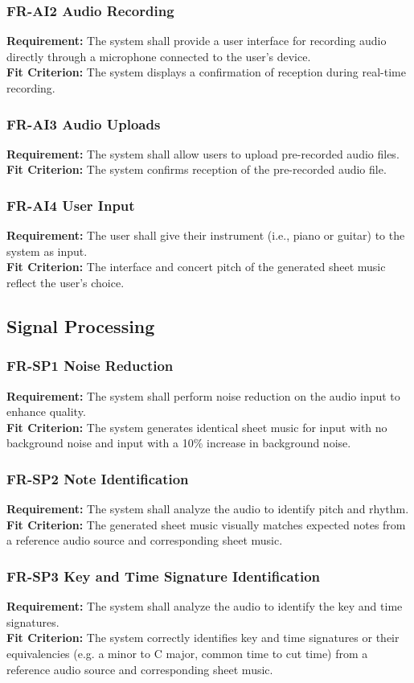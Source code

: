 \documentclass[12pt]{article}
\begin{document}
\subsubsection*{FR-AI2 Audio Recording}
\textbf{Requirement:} The system shall provide a user interface for recording audio directly through a microphone connected to the user's device. \\
\textbf{Fit Criterion:} The system displays a confirmation of reception during real-time recording.
\subsubsection*{FR-AI3 Audio Uploads}
\textbf{Requirement:} The system shall allow users to upload pre-recorded audio files. \\
\textbf{Fit Criterion:} The system confirms reception of the pre-recorded audio file.
\subsubsection*{FR-AI4 User Input}
\textbf{Requirement:} The user shall give their instrument (i.e., piano or guitar) to the system as input. \\
\textbf{Fit Criterion:} The interface and concert pitch of the generated sheet music reflect the user's choice.

\subsection{Signal Processing}
\subsubsection*{FR-SP1 Noise Reduction}
\textbf{Requirement:} The system shall perform noise reduction on the audio input to enhance quality. \\
\textbf{Fit Criterion:} The system generates identical sheet music for input with no background noise and input with a 10\% increase in background noise.
\subsubsection*{FR-SP2 Note Identification}
\textbf{Requirement:} The system shall analyze the audio to identify pitch and rhythm. \\
\textbf{Fit Criterion:} The generated sheet music visually matches expected notes from a reference audio source and corresponding sheet music.
\subsubsection*{FR-SP3 Key and Time Signature Identification}
\textbf{Requirement:}	The system shall analyze the audio to identify the key and time signatures. \\
\textbf{Fit Criterion:} The system correctly identifies key and time signatures or their equivalencies (e.g. a minor to C major, common time to cut time) from a reference audio source and corresponding sheet music.
\end{document}
